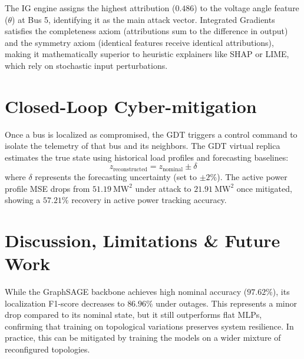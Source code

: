 \documentclass[conference]{IEEEtran}
\begin{document}
\begin{table}[htbp]
  \caption{Feature Attributions for Attack Centered at Bus 5}
  \label{tab:attributions}
  \centering
\end{table}

The IG engine assigns the highest attribution ($0.486$) to the voltage angle feature ($\theta$) at Bus 5, identifying it as the main attack vector. Integrated Gradients satisfies the completeness axiom (attributions sum to the difference in output) and the symmetry axiom (identical features receive identical attributions), making it mathematically superior to heuristic explainers like SHAP or LIME, which rely on stochastic input perturbations.

\section{Closed-Loop Cyber-mitigation}
Once a bus is localized as compromised, the GDT triggers a control command to isolate the telemetry of that bus and its neighbors. The GDT virtual replica estimates the true state using historical load profiles and forecasting baselines:
\begin{equation}
z_{\text{reconstructed}} = z_{\text{nominal}} \pm \delta
\end{equation}
where $\delta$ represents the forecasting uncertainty (set to $\pm 2\%$). The active power profile MSE drops from $51.19~\text{MW}^2$ under attack to $21.91~\text{MW}^2$ once mitigated, showing a $57.21\%$ recovery in active power tracking accuracy.

\section{Discussion, Limitations \& Future Work}
While the GraphSAGE backbone achieves high nominal accuracy ($97.62\%$), its localization F1-score decreases to $86.96\%$ under outages. This represents a minor drop compared to its nominal state, but it still outperforms flat MLPs, confirming that training on topological variations preserves system resilience. In practice, this can be mitigated by training the models on a wider mixture of reconfigured topologies.
\end{document}
